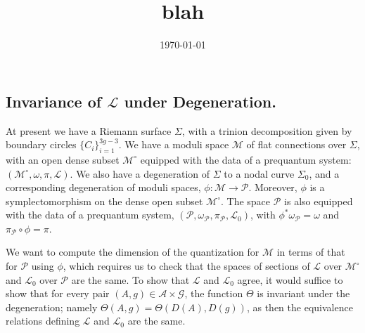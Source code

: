 \documentclass[]{article}
\title{blah}
\date{\today}
\newcommand{\LL}{\mathcal{L}}
\newcommand{\MM}{\mathcal{M}}
\newcommand{\cA}{\mathcal{A}}
\newcommand{\cG}{\mathcal{G}}
\newcommand{\cP}{\mathcal{P}}
\begin{document}
\subsection{Invariance of $\LL$ under Degeneration.}
	At present we have a Riemann surface $\Sigma$, with a trinion decomposition given by boundary circles $\{C_i\}_{i=1}^{3g-3}$. We have a moduli space $\MM$ of flat connections over $\Sigma$, with an open dense subset $\MM^\circ$ equipped with the data of a prequantum system: $(\MM^\circ, \omega, \pi, \LL)$. We also have a degeneration of $\Sigma$ to a nodal curve $\Sigma_0$, and a corresponding degeneration of moduli spaces, $\phi:\MM\to \cP$. Moreover, $\phi$ is a symplectomorphism on the dense open subset $\MM^\circ$. The space $\cP$ is also equipped with the data of a prequantum system, $(\cP, \omega_\cP, \pi_\cP, \LL_0)$, with $\phi^\ast \omega_\cP = \omega$ and $\pi_{\cP}\circ\phi = \pi$. 
	
	We want to compute the dimension of the quantization for $\MM$ in terms of that for $\cP$ using $\phi$, which requires us to check that the spaces of sections of $\LL$ over $\MM^\circ$ and $\LL_0$ over $\cP$ are the same. To show that $\LL$ and $\LL_0$ agree, it would suffice to show that for every pair $(A,g)\in \cA\times \cG$, the function $\Theta$ is invariant under the degeneration; namely $\Theta(A,g) = \Theta(D(A), D(g))$, as then the equivalence relations defining $\LL$ and $\LL_0$ are the same.
	
\end{document}

